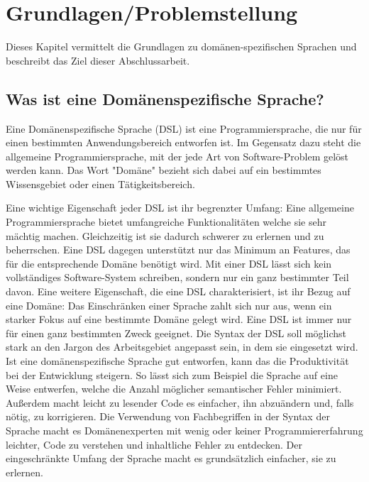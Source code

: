 
\chapter{Grundlagen/Problemstellung}\label{chp:2:grundlagen}
Dieses Kapitel vermittelt die Grundlagen zu domänen-spezifischen Sprachen und beschreibt das Ziel dieser Abschlussarbeit.

\section{Was ist eine Domänenspezifische Sprache?}\label{sct:2.1:dsldef}
Eine Domänenspezifische Sprache (DSL) ist eine Programmiersprache, die nur für einen bestimmten Anwendungsbereich entworfen ist. Im Gegensatz dazu steht die allgemeine Programmiersprache, mit der jede Art von Software-Problem gelöst werden kann\cite{www:fowlerDSL}. Das Wort "Domäne" bezieht sich dabei auf ein bestimmtes Wissensgebiet oder einen Tätigkeitsbereich.

Eine wichtige Eigenschaft jeder DSL ist ihr begrenzter Umfang: Eine allgemeine Programmiersprache bietet umfangreiche Funktionalitäten welche sie sehr mächtig machen. Gleichzeitig ist sie dadurch schwerer zu erlernen und zu beherrschen. Eine DSL dagegen unterstützt nur das Minimum an Features, das für die entsprechende Domäne benötigt wird. Mit einer DSL lässt sich kein vollständiges Software-System schreiben, sondern nur ein ganz bestimmter Teil davon.
Eine weitere Eigenschaft, die eine DSL charakterisiert, ist ihr Bezug auf eine Domäne: Das Einschränken einer Sprache zahlt sich nur aus, wenn ein starker Fokus auf eine bestimmte Domäne gelegt wird. Eine DSL ist immer nur für einen ganz bestimmten Zweck geeignet\cite{book:fowlerDSL}. Die Syntax der DSL soll möglichst stark an den Jargon des Arbeitsgebiet angepasst sein, in dem sie eingesetzt wird.
\\ %
Ist eine domänenspezifische Sprache gut entworfen, kann das die Produktivität bei der Entwicklung steigern. So lässt sich zum Beispiel die Sprache auf eine Weise entwerfen, welche die Anzahl möglicher semantischer Fehler minimiert. Außerdem macht leicht zu lesender Code es einfacher, ihn abzuändern und, falls nötig, zu korrigieren. Die Verwendung von Fachbegriffen in der Syntax der Sprache macht es Domänenexperten mit wenig oder keiner Programmiererfahrung leichter, Code zu verstehen und inhaltliche Fehler zu entdecken. Der eingeschränkte Umfang der Sprache macht es grundsätzlich einfacher, sie zu erlernen.

